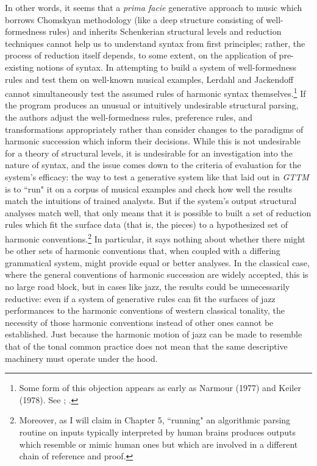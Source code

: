 In other words, it seems that a \emph{prima facie} generative approach to music which borrows Chomskyan methodology (like a deep structure consisting of well-formedness rules) and inherits Schenkerian structural levels and reduction techniques cannot help us to understand syntax from first principles; rather, the process of reduction itself depends, to some extent, on the application of pre-existing notions of syntax.  In attempting to build a system of well-formedness rules and test them on well-known musical examples, Lerdahl and Jackendoff cannot simultaneously test the assumed rules of harmonic syntax themselves.\footnote{Some form of this objection appears as early as Narmour (1977) and Keiler (1978).  See \cite{narmour1977}; \cite{keiler1978}.}  If the program produces an unusual or intuitively undesirable structural parsing, the authors adjust the well-formedness rules, preference rules, and transformations appropriately rather than consider changes to the paradigms of harmonic succession which inform their decisions.  While this is not undesirable for a theory of structural levels, it is undesirable for an investigation into the nature of syntax, and the issue comes down to the criteria of evaluation for the system's efficacy: the way to test a generative system like that laid out in \emph{GTTM} is to ``run" it on a corpus of musical examples and check how well the results match the intuitions of trained analysts.  But if the system's output structural analyses match well, that only means that it is possible to built a set of reduction rules which fit the surface data (that is, the pieces) to a hypothesized set of harmonic conventions.\footnote{Moreover, as I will claim in Chapter 5, ``running" an algorithmic parsing routine on inputs typically interpreted by human brains produces outputs which resemble or mimic human ones but which are involved in a different chain of reference and proof.}  In particular, it says nothing about whether there might be other sets of harmonic conventions that, when coupled with a differing grammatical system, might provide equal or better analyses.  In the classical case, where the general conventions of harmonic succession are widely accepted, this is no large road block, but in cases like jazz, the results could be unnecessarily reductive: even if a system of generative rules can fit the surfaces of jazz performances to the harmonic conventions of western classical tonality, the necessity of those harmonic conventions instead of other ones cannot be established.  Just because the harmonic motion of jazz can be made to resemble that of the tonal common practice does not mean that the same descriptive machinery must operate under the hood.  

